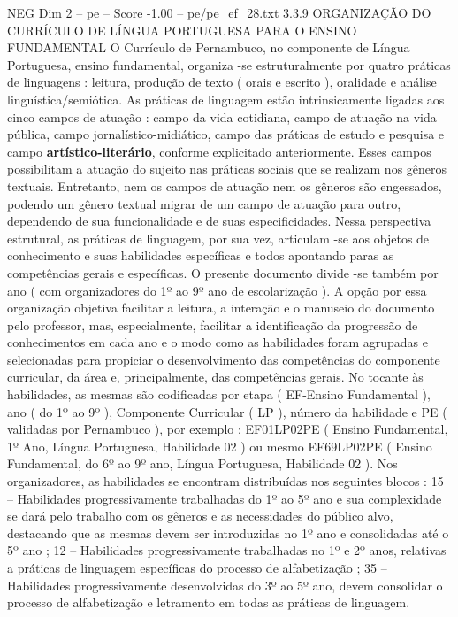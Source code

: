 \begin{textsample}{NEG Dim 2 – pe – Score -1.00 – pe/pe\_ef\_28.txt}  \label{ex:f2_neg_035}
3.3.9 ORGANIZAÇÃO DO CURRÍCULO DE LÍNGUA PORTUGUESA PARA O ENSINO FUNDAMENTAL O Currículo de Pernambuco, no componente de Língua Portuguesa, ensino fundamental, organiza -se estruturalmente por quatro práticas de linguagens : leitura, produção de texto ( orais e escrito ), oralidade e análise linguística/semiótica.
As práticas de linguagem estão intrinsicamente ligadas aos cinco campos de atuação : campo da vida cotidiana, campo de atuação na vida pública, campo jornalístico-midiático, campo das práticas de estudo e pesquisa e campo \textbf{artístico-literário}, conforme explicitado anteriormente.
Esses campos possibilitam a atuação do sujeito nas práticas sociais que se realizam nos gêneros textuais.
Entretanto, nem os campos de atuação nem os gêneros são engessados, podendo um gênero textual migrar de um campo de atuação para outro, dependendo de sua funcionalidade e de suas especificidades.
Nessa perspectiva estrutural, as práticas de linguagem, por sua vez, articulam -se aos objetos de conhecimento e suas habilidades específicas e todos apontando paras as competências gerais e específicas.
O presente documento divide -se também por ano ( com organizadores do 1º ao 9º ano de escolarização ).
A opção por essa organização objetiva facilitar a leitura, a interação e o manuseio do documento pelo professor, mas, especialmente, facilitar a identificação da progressão de conhecimentos em cada ano e o modo como as habilidades foram agrupadas e selecionadas para propiciar o desenvolvimento das competências do componente curricular, da área e, principalmente, das competências gerais.
No tocante às habilidades, as mesmas são codificadas por etapa ( EF-Ensino Fundamental ), ano ( do 1º ao 9º ), Componente Curricular ( LP ), número da habilidade e PE ( validadas por Pernambuco ), por exemplo : EF01LP02PE ( Ensino Fundamental, 1º Ano, Língua Portuguesa, Habilidade 02 ) ou mesmo EF69LP02PE ( Ensino Fundamental, do 6º ao 9º ano, Língua Portuguesa, Habilidade 02 ).
Nos organizadores, as habilidades se encontram distribuídas nos seguintes blocos : 15 – Habilidades progressivamente trabalhadas do 1º ao 5º ano e sua complexidade se dará pelo trabalho com os gêneros e as necessidades do público alvo, destacando que as mesmas devem ser introduzidas no 1º ano e consolidadas até o 5º ano ; 12 – Habilidades progressivamente trabalhadas no 1º e 2º anos, relativas a práticas de linguagem específicas do processo de alfabetização ; 35 – Habilidades progressivamente desenvolvidas do 3º ao 5º ano, devem consolidar o processo de alfabetização e letramento em todas as práticas de linguagem.

\end{textsample}
